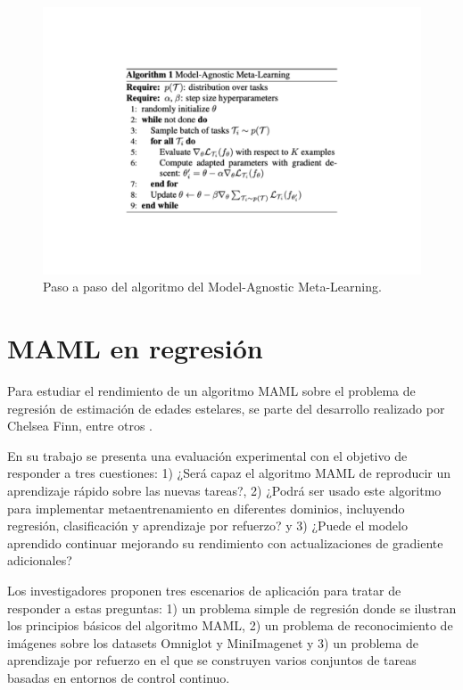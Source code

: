 \begin{figure}[H]
\begin{center}
 \includegraphics[width=0.8\linewidth]{Figuras/MAML/maml_alg.pdf}
\end{center}
\caption{Paso a paso del algoritmo del Model-Agnostic Meta-Learning.}
 \label{fig:algorithm_maml}
\end{figure}


\section{MAML en regresión}

Para estudiar el rendimiento de un algoritmo MAML sobre el problema de regresión de estimación de edades estelares, se parte del desarrollo realizado por Chelsea Finn, entre otros \cite{finn2017modelagnostic}. 

En su trabajo se presenta una evaluación experimental con el objetivo de responder a tres cuestiones: 1) ¿Será capaz el algoritmo MAML de reproducir un aprendizaje rápido sobre las nuevas tareas?, 2) ¿Podrá ser usado este algoritmo para implementar metaentrenamiento en diferentes dominios, incluyendo regresión, clasificación y aprendizaje por refuerzo? y 3) ¿Puede el modelo aprendido continuar mejorando su rendimiento con actualizaciones de gradiente adicionales?

Los investigadores proponen tres escenarios de aplicación para tratar de responder a estas preguntas: 1) un problema simple de regresión donde se ilustran los principios básicos del algoritmo MAML, 2) un problema de reconocimiento de imágenes sobre los datasets Omniglot y MiniImagenet y 3) un problema de aprendizaje por refuerzo en el que se construyen varios conjuntos de tareas basadas en entornos de control continuo.


